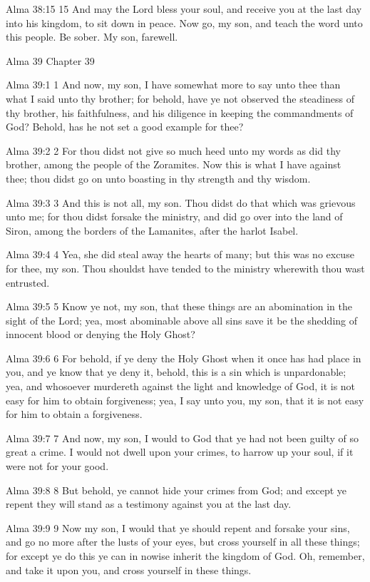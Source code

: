 Alma 38:15
 15 And may the Lord bless your soul, and receive you at the last
day into his kingdom, to sit down in peace. Now go, my son, and
teach the word unto this people. Be sober. My son, farewell.

Alma 39
Chapter 39

Alma 39:1
 1 And now, my son, I have somewhat more to say unto thee than
what I said unto thy brother; for behold, have ye not observed
the steadiness of thy brother, his faithfulness, and his
diligence in keeping the commandments of God? Behold, has he not
set a good example for thee?

Alma 39:2
 2 For thou didst not give so much heed unto my words as did thy
brother, among the people of the Zoramites. Now this is what I
have against thee; thou didst go on unto boasting in thy strength
and thy wisdom.

Alma 39:3
 3 And this is not all, my son. Thou didst do that which was
grievous unto me; for thou didst forsake the ministry, and did go
over into the land of Siron, among the borders of the Lamanites,
after the harlot Isabel.

Alma 39:4
 4 Yea, she did steal away the hearts of many; but this was no
excuse for thee, my son. Thou shouldst have tended to the
ministry wherewith thou wast entrusted.

Alma 39:5
 5 Know ye not, my son, that these things are an abomination in
the sight of the Lord; yea, most abominable above all sins save
it be the shedding of innocent blood or denying the Holy Ghost?

Alma 39:6
 6 For behold, if ye deny the Holy Ghost when it once has had
place in you, and ye know that ye deny it, behold, this is a sin
which is unpardonable; yea, and whosoever murdereth against the
light and knowledge of God, it is not easy for him to obtain
forgiveness; yea, I say unto you, my son, that it is not easy for
him to obtain a forgiveness.

Alma 39:7
 7 And now, my son, I would to God that ye had not been guilty of
so great a crime. I would not dwell upon your crimes, to harrow
up your soul, if it were not for your good.

Alma 39:8
 8 But behold, ye cannot hide your crimes from God; and except ye
repent they will stand as a testimony against you at the last
day.

Alma 39:9
 9 Now my son, I would that ye should repent and forsake your
sins, and go no more after the lusts of your eyes, but cross
yourself in all these things; for except ye do this ye can in
nowise inherit the kingdom of God. Oh, remember, and take it
upon you, and cross yourself in these things.

